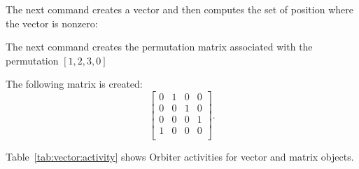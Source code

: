 \bigskip

The next command creates a vector and then computes the set of position where the vector is nonzero: 



\bigskip


The next command creates the permutation matrix associated with the permutation $[1,2,3,0]$


The following matrix is created: 
$$
\left[
\begin{array}{cccc}
0&1&0&0\\
0&0&1&0\\
0&0&0&1\\
1&0&0&0\\
\end{array}
\right].
$$

\bigskip



Table~\ref{tab:vector:activity} shows Orbiter activities for vector and matrix objects.


\bigskip

